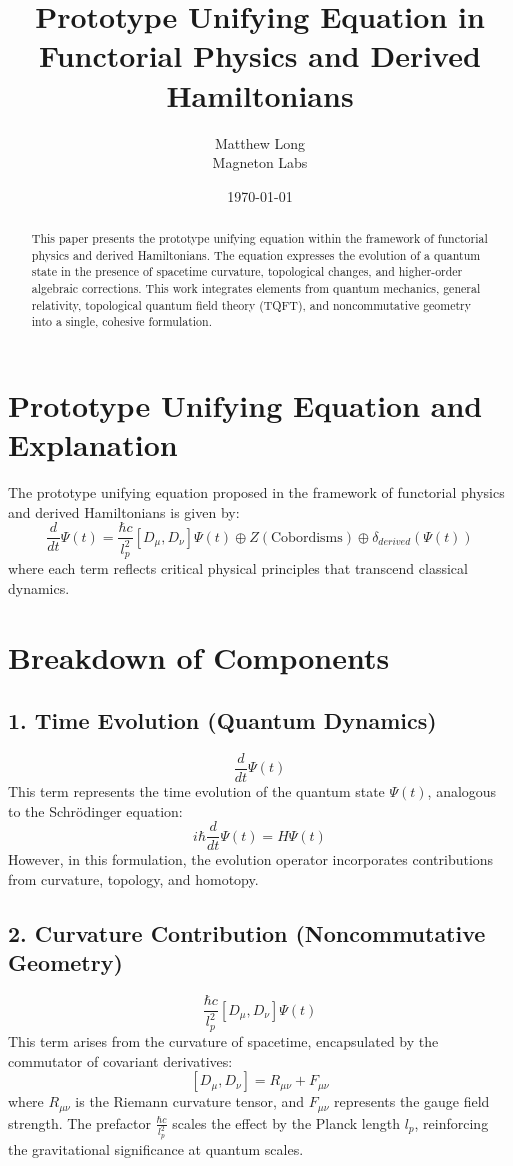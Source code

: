 \documentclass[12pt]{article}
\title{Prototype Unifying Equation in Functorial Physics and Derived Hamiltonians}
\author{Matthew Long \\ Magneton Labs}
\date{\today}
\begin{document}
\maketitle

\begin{abstract}
This paper presents the prototype unifying equation within the framework of functorial physics and derived Hamiltonians. The equation expresses the evolution of a quantum state in the presence of spacetime curvature, topological changes, and higher-order algebraic corrections. This work integrates elements from quantum mechanics, general relativity, topological quantum field theory (TQFT), and noncommutative geometry into a single, cohesive formulation.
\end{abstract}

\section{Prototype Unifying Equation and Explanation}
The prototype unifying equation proposed in the framework of functorial physics and derived Hamiltonians is given by:
\[
\frac{d}{dt}\Psi(t) = \frac{\hbar c}{l_p^2}[D_\mu, D_\nu]\Psi(t) \oplus Z(\text{Cobordisms}) \oplus \delta_{derived}(\Psi(t))
\]
where each term reflects critical physical principles that transcend classical dynamics.

\section{Breakdown of Components}
\subsection{1. Time Evolution (Quantum Dynamics)}
\[
\frac{d}{dt}\Psi(t)
\]
This term represents the time evolution of the quantum state \( \Psi(t) \), analogous to the Schrödinger equation:
\[
i \hbar \frac{d}{dt}\Psi(t) = H \Psi(t)
\]
However, in this formulation, the evolution operator incorporates contributions from curvature, topology, and homotopy.

\subsection{2. Curvature Contribution (Noncommutative Geometry)}
\[
\frac{\hbar c}{l_p^2}[D_\mu, D_\nu]\Psi(t)
\]
This term arises from the curvature of spacetime, encapsulated by the commutator of covariant derivatives:
\[
[D_\mu, D_\nu] = R_{\mu\nu} + F_{\mu\nu}
\]
where \( R_{\mu\nu} \) is the Riemann curvature tensor, and \( F_{\mu\nu} \) represents the gauge field strength. The prefactor \( \frac{\hbar c}{l_p^2} \) scales the effect by the Planck length \( l_p \), reinforcing the gravitational significance at quantum scales.
\end{document}
